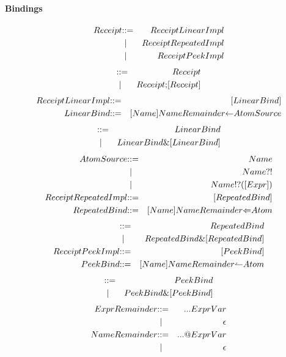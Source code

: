 \paragraph{Bindings}
\begin{eqnarray*}
  Receipt & \mathbin{\mathbf{::=}} & ReceiptLinearImpl \\
  & \;\mathbin{\mathbf\mid} \; & ReceiptRepeatedImpl \\
  & \;\mathbin{\mathbf\mid} \; & ReceiptPeekImpl
\end{eqnarray*}
\begin{eqnarray*}
  [Receipt] & \bc & Receipt \\
  & \;\bm \; & Receipt \mathsf{;} [Receipt]
\end{eqnarray*}
\begin{eqnarray*}
  ReceiptLinearImpl & \mathbin{\mathbf{::=}} & [LinearBind] \\
  LinearBind & \mathbin{\mathbf{::=}} & [Name] NameRemainder \mathsf{\leftarrow} AtomSource
\end{eqnarray*}
\begin{eqnarray*}
  [LinearBind] & \bc & LinearBind \\
  & \;\bm \; & LinearBind \mathsf{\&} [LinearBind]
\end{eqnarray*}
\begin{eqnarray*}
  AtomSource & \mathbin{\mathbf{::=}} & Name \\
  & \;\mathbin{\mathbf\mid} \; & Name \mathsf{?!} \\
  & \;\mathbin{\mathbf\mid} \; & Name \mathsf{!?} \mathsf{(} [Expr] \mathsf{)} \\
  ReceiptRepeatedImpl & \mathbin{\mathbf{::=}} & [RepeatedBind] \\
  RepeatedBind & \mathbin{\mathbf{::=}} & [Name] NameRemainder \mathsf{\Leftarrow} Atom
\end{eqnarray*}
\begin{eqnarray*}
  [RepeatedBind] & \bc & RepeatedBind \\
  & \;\bm \; & RepeatedBind \mathsf{\&} [RepeatedBind] \\
  ReceiptPeekImpl & \bc & [PeekBind] \\
  PeekBind & \bc & [Name] NameRemainder \mathsf{\leftharpoonup} Atom
\end{eqnarray*}
\begin{eqnarray*}
  [PeekBind] & \bc & PeekBind \\
  & \;\bm \; & PeekBind \mathsf{\&} [PeekBind]
\end{eqnarray*}
\begin{eqnarray*}
  ExprRemainder & \mathbin{\mathbf{::=}} & \mathsf{...} ExprVar \\
 & \;\mathbin{\mathbf\mid} \; & \epsilon \\
  NameRemainder & \mathbin{\mathbf{::=}} & \mathsf{...} \mathsf{@} ExprVar \\
& \;\mathbin{\mathbf\mid} \; & \epsilon
\end{eqnarray*}

